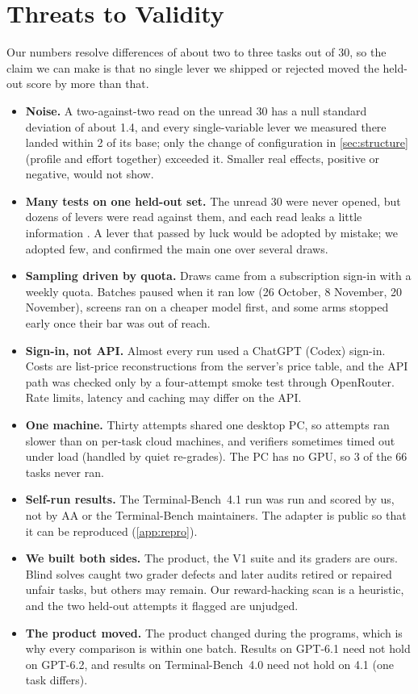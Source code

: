 \section{Threats to Validity}
\label{sec:threats}

Our numbers resolve differences of about two to three tasks out of 30, so the claim we can make is
that no single lever we shipped or rejected moved the held-out score by more than that.

\begin{itemize}[leftmargin=1.4em]
  \item \textbf{Noise.} A two-against-two read on the unread 30 has a null standard deviation of
    about 1.4, and every single-variable lever we measured there landed within 2 of its base; only
    the change of configuration in \cref{sec:structure} (profile and effort together) exceeded it.
    Smaller real effects, positive or negative, would not show.
  \item \textbf{Many tests on one held-out set.} The unread 30 were never opened, but dozens of
    levers were read against them, and each read leaks a little information
    \citep{dwork2015reusable}. A lever that passed by luck would be adopted by mistake; we adopted
    few, and confirmed the main one over several draws.
  \item \textbf{Sampling driven by quota.} Draws came from a subscription sign-in with a weekly
    quota. Batches paused when it ran low (26 October, 8 November, 20 November), screens ran on a
    cheaper model first, and some arms stopped early once their bar was out of reach.
  \item \textbf{Sign-in, not API.} Almost every run used a ChatGPT (Codex) sign-in. Costs are
    list-price reconstructions from the server's price table, and the API path was checked only by
    a four-attempt smoke test through OpenRouter. Rate limits, latency and caching may differ on the
    API.
  \item \textbf{One machine.} Thirty attempts shared one desktop PC, so attempts ran slower than on
    per-task cloud machines, and verifiers sometimes timed out under load (handled by quiet
    re-grades). The PC has no GPU, so 3 of the 66 tasks never ran.
  \item \textbf{Self-run results.} The Terminal-Bench~4.1 run was run and scored by us, not by AA or
    the Terminal-Bench maintainers. The adapter is public so that it can be reproduced
    (\cref{app:repro}).
  \item \textbf{We built both sides.} The product, the V1 suite and its graders are ours. Blind
    solves caught two grader defects and later audits retired or repaired unfair tasks, but others
    may remain. Our reward-hacking scan is a heuristic, and the two held-out attempts it flagged are
    unjudged.
  \item \textbf{The product moved.} The product changed during the programs, which is why every
    comparison is within one batch. Results on GPT-6.1 need not hold on GPT-6.2, and results on
    Terminal-Bench~4.0 need not hold on 4.1 (one task differs).
\end{itemize}

